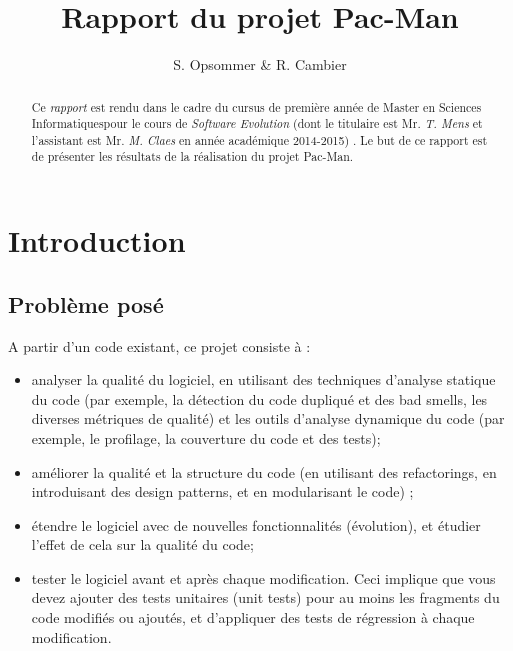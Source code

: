 \documentclass[12pt,a4paper,final]{article}
\author{S. Opsommer \& R. Cambier}
\title{Rapport du projet Pac-Man}
\newcommand{\smalltitle}[1]{\bigskip\large\textbf{#1}\par\normalsize\medskip}
\begin{document}
\umonsCoverPage
\pagebreak

\pagestyle{fancy}

\thispagestyle{empty}
\newpage
\tableofcontents
\newpage

\thispagestyle{empty}
\begin{abstract}
Ce \emph{rapport} est rendu dans le cadre du cursus de première année de \og Master en Sciences Informatiques\fg  pour le cours de \emph{Software Evolution} (dont le titulaire est Mr. \emph{T. Mens} et l'assistant est Mr. \emph{M. Claes} en année académique 2014-2015) . Le but de ce rapport est de présenter les résultats de la réalisation du projet Pac-Man.
\end{abstract}

\newpage
\section{Introduction}\label{sec:intro}
\subsection{Problème posé}
A partir d'un code existant, ce projet consiste à : 
\begin{itemize}
\item analyser la qualité du logiciel, en utilisant des techniques d'analyse statique du code (par exemple, la détection du code dupliqué et des bad smells, les diverses métriques de qualité) et les outils d'analyse dynamique du code (par exemple, le profilage, la couverture du code et des tests);
\item améliorer la qualité et la structure du code (en utilisant des refactorings, en introduisant des design patterns, et en modularisant le code) ;
\item étendre le logiciel avec de nouvelles fonctionnalités (évolution), et étudier l'effet de cela sur la qualité du code;
\item tester le logiciel avant et après chaque modification. Ceci implique que vous devez ajouter des tests unitaires (unit tests) pour au moins les fragments du code modifiés ou ajoutés, et d'appliquer des tests de régression à chaque modification.
\end{itemize}
\end{document}
